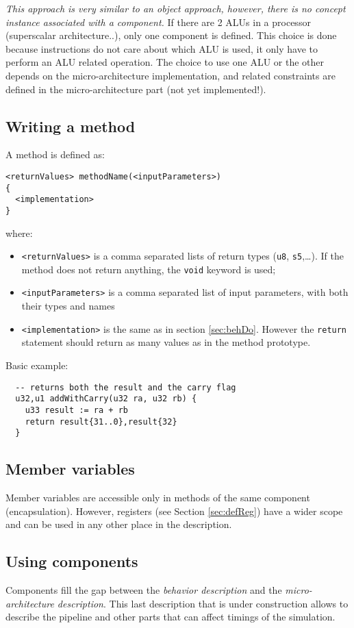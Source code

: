 \emph{This approach is very similar to an object approach, however, there is no concept instance associated with a component.} If there are 2 ALUs in a processor (superscalar architecture..), only one component is defined. This choice is done because instructions do not care about which ALU is used, it only have to perform an ALU related operation. The choice to use one ALU or the other depends on the micro-architecture implementation, and related constraints are defined in the micro-architecture part (not yet implemented!).

\subsection{Writing a method}

A method is defined as:
\begin{verbatim}
<returnValues> methodName(<inputParameters>)
{
  <implementation>
}
\end{verbatim}
where:
\begin{itemize}
\item \texttt{<returnValues>} is a comma separated lists of return types (\texttt{u8}, \texttt{s5},\ldots). If the method does not return anything, the \texttt{void} keyword is used;
\item \texttt{<inputParameters>} is a comma separated list of input parameters, with both their types and names
\item \texttt{<implementation>} is the same as in section \ref{sec:behDo}. However the \texttt{return} statement should return as many values as in the method prototype.
\end{itemize}

Basic example:
\begin{lstlisting}
  -- returns both the result and the carry flag
  u32,u1 addWithCarry(u32 ra, u32 rb) {
    u33 result := ra + rb
    return result{31..0},result{32}
  }
\end{lstlisting}

\subsection{Member variables}
Member variables are accessible only in methods of the same component (encapsulation). However, registers (see Section \ref{sec:defReg}) have a wider scope and can be used in any other place in the description.


\subsection{Using components}
Components fill the gap between the \emph{behavior description} and the \emph{micro-architecture description}. This last description that is under construction allows to describe the pipeline and other parts that can affect timings of the simulation.

